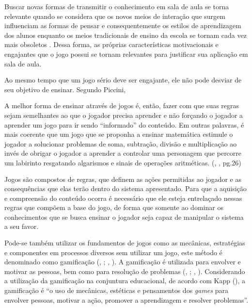 Buscar novas formas de transmitir o conhecimento em sala de aula se torna relevante quando se considera que os novos meios de interação que surgem influenciam as formas de pensar e consequentemente os estilos de aprendizagem dos alunos enquanto os meios tradicionais de ensino da escola se tornam cada vez mais obsoletos \cite{prensky2012}. Dessa forma, as próprias características motivacionais e engajantes que o jogo possui se tornam relevantes para justificar sua aplicação em sala de aula.

Ao mesmo tempo que um jogo sério deve ser engajante, ele não pode desviar de seu objetivo de ensinar. Segundo Piccini,

\begin{citacao}
A melhor forma de ensinar através de jogos é, então, fazer com que suas regras sejam semelhantes ao que o jogador precisa aprender e não forçando o jogador a aprender um jogo para ir sendo “informado” do conteúdo. Em outras palavras, é mais coerente que um jogo que se proponha a ensinar matemática estimule o jogador a solucionar problemas de soma, subtração, divisão e multiplicação ao invés de obrigar o jogador a aprender a controlar uma personagem que percorre um labirinto resgatando algarismos e sinais de operações aritméticas. (\citeauthor{piccini2008}, \citeyear{piccini2008}, pg.26)
\end{citacao}

Jogos são compostos de regras, que definem as ações permitidas ao jogador e as consequências que elas terão dentro do sistema apresentado. Para que a aquisição e compreensão do conteúdo ocorra é necessário que ele esteja entrelaçado nessas regras que compõem a base do jogo, de forma que somente ao dominar os conhecimentos que se busca ensinar o jogador seja capaz de manipular o sistema a seu favor.

Pode-se também utilizar os fundamentos de jogos como as mecânicas, estratégias e componentes em processos diversos sem utilizar um jogo, este método é denominado como gamificação (\citeauthor{deterding2011}, \citeyear{deterding2011}; \citeauthor{kapp2012}, \citeyear{kapp2012}). A gamificação é utilizada para envolver e motivar as pessoas, bem como para resolução de problemas (\citeauthor{kapp2012}, \citeyear{kapp2012}; \citeauthor{zichermann2011}, \citeyear{zichermann2011}). Considerando a utilização da gamificação na conjuntura educacional, de acordo com Kapp (\citeyear{kapp2012}), a gamificação é “o uso de mecânicas, estéticas e pensamentos dos \textit{games} para envolver pessoas, motivar a ação, promover a aprendizagem e resolver problemas”.

